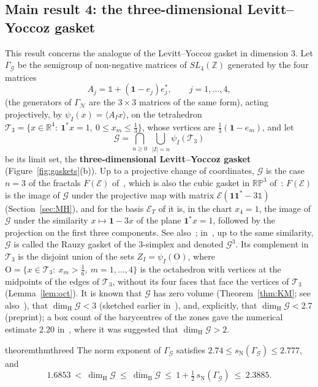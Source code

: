 \documentclass[11pt]{amsart}
\newcommand{\id}{\mathds{1}}
\theoremstyle{definition}
\theoremstyle{remark}
\newcommand{\one}{\mathbf 1}
\newcommand{\R}{\mathbb R}
\newcommand{\Z}{\mathbb Z}
\newcommand{\RP}{\mathbb{RP}}
\newcommand{\cT}{\mathcal T}
\newcommand{\GN}{\Gamma_{\mathcal N}}
\newcommand{\cG}{\mathcal G}
\newcommand{\GG}{\Gamma_{\mathcal G}}
\newcommand{\Oct}{\mathrm{O}}
\newcommand{\udimB}{\overline{\dim}_{\mathrm B}}
\newcommand{\sN}{s_{\mathrm N}}
\newcommand{\dimH}{\dim_{\mathrm H}}
\newcommand{\abs}[1]{\lvert #1\rvert}
\newcommand{\pr}[1]{\langle #1\rangle}
\begin{document}
\subsection*{Main result 4: the three-dimensional Levitt--Yoccoz gasket}
This result concerns the analogue of the Levitt--Yoccoz gasket in dimension 3.
Let $\GG$ be the semigroup of non-negative matrices of $SL_4(\Z)$ generated by the four matrices
\[
  A_j=\id+(\one-e_j)e_j^*,\qquad j=1,\dots,4,
\]
(the generators of $\GN$ are the $3\times3$ matrices of the same form), acting projectively, by $\psi_I(x)=\pr{A_Ix}$, on the tetrahedron $\cT_3=\{x\in\R^4:\ \one^*x=1,\ 0\le x_m\le\frac13\}$, whose vertices are $\frac13(\one-e_m)$, and let
\[
  \cG=\bigcap_{n\ge0}\ \bigcup_{\abs I=n}\psi_I(\cT_3)
\]
be its limit set, the \textbf{three-dimensional Levitt--Yoccoz gasket} (Figure~\ref{fig:gaskets}(b)). Up to a projective change of coordinates, $\cG$ is the case $n=3$ of the fractals $F(\mathcal E)$ of~\cite{DL08}, which is also the cubic gasket in $\RP^3$ of~\cite{DL15JGA}: $F(\mathcal E)$ is the image of $\cG$ under the projective map with matrix $\mathcal E(\one\one^*-3\id)$ (Section~\ref{sec:MH}), and for the basis $\mathcal E_T$ of \cite[\S4.3]{DL08} it is, in the chart $x_4=1$, the image of $\cG$ under the similarity $x\mapsto\one-3x$ of the plane $\one^*x=1$, followed by the projection on the first three components.
See also~\cite{AS13,Fou20}; in~\cite{Fou20}, up to the same similarity, $\cG$ is called the Rauzy gasket of the $3$-simplex and denoted $\mathcal G^3$.
Its complement in $\cT_3$ is the disjoint union of the sets $Z_I=\psi_I(\Oct)$, where $\Oct=\{x\in\cT_3:\ x_m>\frac16,\ m=1,\dots,4\}$ is the octahedron with vertices at the midpoints of the edges of $\cT_3$, without its four faces that face the vertices of $\cT_3$ (Lemma~\ref{lem:oct}).
It is known that $\cG$ has zero volume (Theorem~\ref{thm:KM}; see also~\cite[Thm.~1]{DL08}), that $\dimH\cG<3$ \cite{Fou20,PS24} (sketched earlier in~\cite[\S11]{AHS16}), and, explicitly, that $\dimH\cG<2.7$ \cite{Fou20} (preprint); a box count of the barycentres of the zones gave the numerical estimate $2.20$ in~\cite{DL08}, where it was suggested that $\dimH\cG>2$.

\begin{restatable}{theorem}{thmthreed}
    \label{thm:3d}
    The norm exponent of $\GG$ satisfies $2.74\le\sN(\GG)\le2.777$, and
    \[
      1.6853\ <\ \dimH\cG\ \le\ \udimB\cG\ \le\ 1+\tfrac12\,\sN(\GG)\ \le\ 2.3885 .
    \]
\end{restatable}
\end{document}
